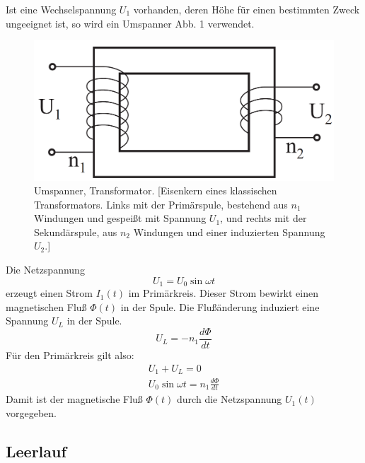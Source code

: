 \documentclass[12pt,a4paper,twoside]{article}
\theoremstyle{definition}
\begin{document}
Ist eine Wechselspannung $U_1$ vorhanden, deren Höhe für einen bestimmten Zweck ungeeignet
ist, so wird ein Umspanner Abb. 1 verwendet.
\begin{figure}[H]
    \centering
    \includegraphics[width=\linewidth/3]{grundlagen/abb1}
    \caption{Umspanner, Transformator. [Eisenkern eines klassischen Transformators. Links mit der Primärspule, bestehend aus $n_1$ Windungen und gespeißt mit Spannung $U_1$, und rechts mit der Sekundärspule, aus $n_2$ Windungen und einer induzierten Spannung $U_2$.]}
\end{figure}
Die Netzspannung
\begin{equation}
    U_1 = U_0 \sin \omega t
\end{equation}
erzeugt einen Strom $I_1(t)$ im Primärkreis. Dieser Strom bewirkt einen magnetischen Fluß $\Phi(t)$ in der Spule. Die Flußänderung induziert eine Spannung $U_L$ in der Spule.
\begin{equation}
    U_L = - n_1 \frac{d \Phi}{d t}
\end{equation}
Für den Primärkreis gilt also:
\begin{gather}
    U_1 + U_L = 0 \\
    U_0 \sin \omega t = n_1 \frac{d \Phi}{d t}
\end{gather}
Damit ist der magnetische Fluß $\Phi(t)$ durch die Netzspannung $U_1(t)$ vorgegeben.


\subsection{Leerlauf}
\end{document}
